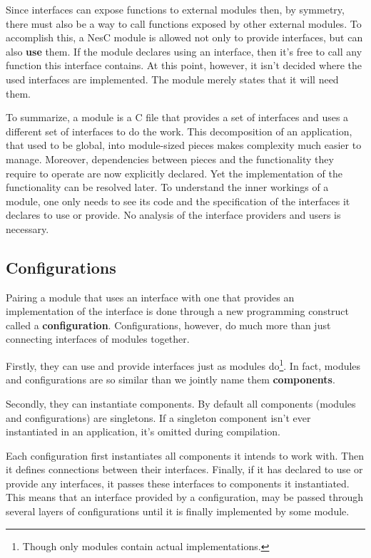 Since interfaces can expose functions to external modules then, by symmetry, there must also be a way to call functions exposed by other external modules. To accomplish this, a NesC module is allowed not only to provide interfaces, but can also {\bf use} them. If the module declares using an interface, then it's free to call any function this interface contains. At this point, however, it isn't decided where the used interfaces are implemented. The module merely states that it will need them.

To summarize, a module is a C file that provides a set of interfaces and uses a different set of interfaces to do the work. This decomposition of an application, that used to be global, into module-sized pieces makes complexity much easier to manage. Moreover, dependencies between pieces and the functionality they require to operate are now explicitly declared. Yet the implementation of the functionality can be resolved later. To understand the inner workings of a module, one only needs to see its code and the specification of the interfaces it declares to use or provide. No analysis of the interface providers and users is necessary.

\subsection{Configurations}

Pairing a module that uses an interface with one that provides an implementation of the interface is done through a new programming construct called a {\bf configuration}. Configurations, however, do much more than just connecting interfaces of modules together.

Firstly, they can use and provide interfaces just as modules do\footnote{Though only modules contain actual implementations.}. In fact, modules and configurations are so similar than we jointly name them {\bf components}.

Secondly, they can instantiate components. By default all components (modules and configurations) are singletons. If a singleton component isn't ever instantiated in an application, it's omitted during compilation.

Each configuration first instantiates all components it intends to work with. Then it defines connections between their interfaces. Finally, if it has declared to use or provide any interfaces, it passes these interfaces to components it instantiated.  This means that an interface provided by a configuration, may be passed through several layers of configurations until it is finally implemented by some module.

